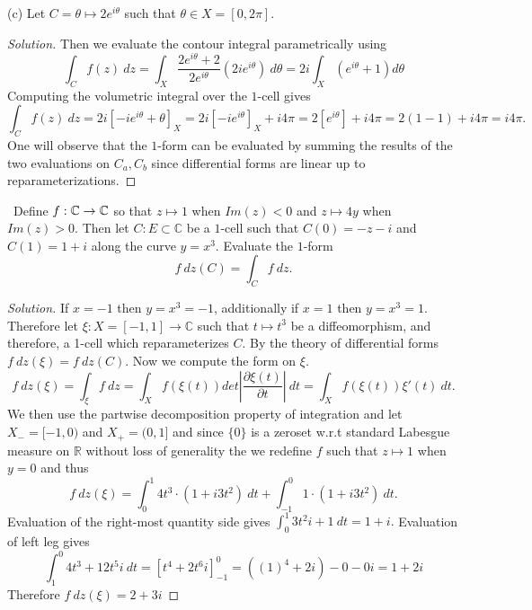 \documentclass[11pt]{amsart}
\theoremstyle{definition}
\numberwithin{theorem}{section}
\numberwithin{definition}{section}
\numberwithin{equation}{section}
\def\complex{{\mathbb C}\/}
\newenvironment{solution}
  {\begin{proof}[Solution]}
  {\end{proof}}
\begin{document}
\noindent (c) Let $C = \theta \mapsto 2e^{i\theta}$ such that $\theta \in X = [0, 2\pi].$
\begin{solution}
	Then we evaluate the contour integral parametrically using
	\begin{equation*}
		\int_C f(z)\ dz = \int_X \frac{2e^{i\theta} + 2}{2e^{i\theta}}\left(2ie^{i\theta}\right)\ d\theta
		= 2i\int_X \left(e^{i\theta} + 1\right) d\theta
	\end{equation*}
	Computing the volumetric integral over the $1$-cell gives
	\begin{equation*}
		\int_C f(z)\ dz = 2i\left[-ie^{i\theta} + \theta\right]_X =2i\left[-ie^{i\theta} \right]_X + i4\pi
		=2\left[e^{i\theta}\right] + i4\pi = 2(1 - 1) + i4\pi = i4\pi.
	\end{equation*}
	One will observe that the $1$-form can be evaluated by summing the results of the two evaluations
	on $C_a, C_b$ since differential forms are linear up to reparameterizations.
\end{solution}
\medskip {}\  Define $f: \complex \to \complex$ so that $z \mapsto 1$ when $Im(z) < 0$
and $z \mapsto 4y$ when $Im(z) > 0.$ Then let $C: E \subset \mathbb{C}$ be a $1$-cell such that $C(0) = -z -i$
and $C(1) = 1+i$ along the curve $y = x^3.$ Evaluate the $1$-form $$f\  dz(C) = \int_C f\ dz.$$
\begin{solution}
	If $x = -1$ then $y = x^3 = -1$, additionally if $x = 1$ then $y = x^3 = 1$. Therefore let $\xi: X= [-1,1] \to \mathbb{C}$ such that $t \mapsto t^3$ be a diffeomorphism, and therefore, a 1-cell which reparameterizes $C$. By the theory of differential forms $f\ dz(\xi) = f\ dz(C).$ Now we compute the form on $\xi.$
	\begin{equation*}
		f\ dz(\xi) = \int_\xi f\ dz = \int_X f(\xi(t))  det\left|\frac{\partial \xi(t)}{\partial t}\right|\ dt = \int_X f(\xi(t))\xi'(t)\ dt.
	\end{equation*}
	We then use the partwise decomposition property of integration and let $X_- = [-1,0)$ and $X_+ =(0,1]$ and
	since $\{0\}$ is a zeroset w.r.t standard Labesgue measure on $\mathbb{R}$ without loss of generality the we redefine $f$ such that $z \mapsto 1$ when $y = 0$ and thus 
	\begin{equation*}
		f\ dz(\xi) = \int_{0}^1 4t^3\cdot(1 + i3t^2)\ dt + \int_{-1}^0 1\cdot(1 + i3t^2)\ dt.
	\end{equation*}
	Evaluation of the right-most quantity side gives $\int_0^1 3t^2i + 1\ dt = 1+ i.$ Evaluation of left leg
	gives 
	\begin{equation*}
		\int_{1}^0 4t^3 + 12t^5i \ dt = \left[t^4 + 2t^6i\right]_{-1}^0  = ((1)^4 + 2i) - 0 - 0i = 1 + 2i
	\end{equation*}
	Therefore $f\ dz(\xi) = 2 + 3i$

\end{solution}
\end{document}
